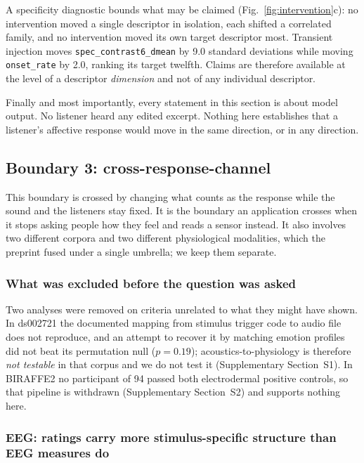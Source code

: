 A specificity diagnostic bounds what may be claimed
(Fig.~\ref{fig:intervention}c): no intervention moved a single descriptor in
isolation, each shifted a correlated family, and no intervention moved its
own target descriptor most. Transient injection moves
\texttt{spec\_contrast6\_dmean} by 9.0 standard deviations while moving
\texttt{onset\_rate} by 2.0, ranking its target twelfth. Claims are therefore
available at the level of a descriptor \emph{dimension} and not of any
individual descriptor.

Finally and most importantly, every statement in this section is about model
output. No listener heard any edited excerpt. Nothing here establishes that a
listener's affective response would move in the same direction, or in any
direction.

\subsection{Boundary 3: cross-response-channel}
\label{sec:channel}

This boundary is crossed by changing what counts as the response while the
sound and the listeners stay fixed. It is the boundary an application crosses
when it stops asking people how they feel and reads a sensor instead. It also
involves two different corpora and two different physiological modalities,
which the preprint fused under a single umbrella; we keep them separate.

\subsubsection{What was excluded before the question was asked}

Two analyses were removed on criteria unrelated to what they might have shown.
In ds002721 the documented mapping from stimulus trigger code to audio file
does not reproduce, and an attempt to recover it by matching emotion profiles
did not beat its permutation null ($p = 0.19$); acoustics-to-physiology is
therefore \emph{not testable} in that corpus and we do not test it
(Supplementary Section~S1). In BIRAFFE2 no participant of 94 passed both
electrodermal positive controls, so that pipeline is withdrawn (Supplementary
Section~S2) and supports nothing here.

\subsubsection{EEG: ratings carry more stimulus-specific structure than EEG
measures do}

